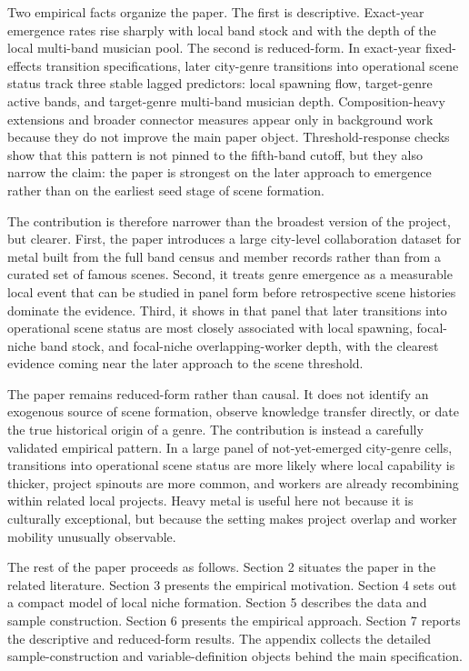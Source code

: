 Two empirical facts organize the paper. The first is descriptive. Exact-year emergence rates rise
sharply with local band stock and with the depth of the local multi-band musician pool. The second
is reduced-form. In exact-year fixed-effects transition specifications, later city-genre
transitions into operational scene status track three stable lagged predictors: local spawning
flow, target-genre active bands, and target-genre multi-band musician depth. Composition-heavy
extensions and broader connector measures appear only in background work because they do not
improve the main paper object. Threshold-response checks show that this pattern is not pinned to
the fifth-band cutoff, but they also narrow the claim: the paper is strongest on the later
approach to emergence rather than on the earliest seed stage of scene formation.

The contribution is therefore narrower than the broadest version of the project, but clearer.
First, the paper introduces a large city-level collaboration dataset for metal built from the full
band census and member records rather than from a curated set of famous scenes. Second, it treats
genre emergence as a measurable local event that can be studied in panel form before retrospective
scene histories dominate the evidence. Third, it shows in that panel that later transitions into
operational scene status are most closely associated with local spawning, focal-niche band stock,
and focal-niche overlapping-worker depth, with the clearest evidence coming near the later
approach to the scene threshold.

The paper remains reduced-form rather than causal. It does not identify an exogenous source of
scene formation, observe knowledge transfer directly, or date the true historical origin of a
genre. The contribution is instead a carefully validated empirical pattern. In a large panel of
not-yet-emerged city-genre cells, transitions into operational scene status are more likely where
local capability is thicker, project spinouts are more common, and workers are already recombining
within related local projects. Heavy metal is useful here not because it is culturally
exceptional, but because the setting makes project overlap and worker mobility unusually
observable.

The rest of the paper proceeds as follows. Section 2 situates the paper in the related
literature. Section 3 presents the empirical motivation. Section 4 sets out a compact model of
local niche formation. Section 5 describes the data and sample construction. Section 6 presents the
empirical approach. Section 7 reports the descriptive and reduced-form results. The appendix
collects the detailed sample-construction and variable-definition objects behind the main
specification.
